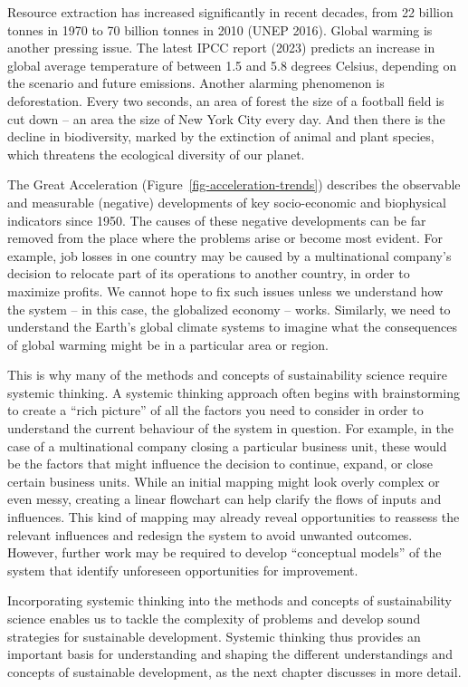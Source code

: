 \documentclass[
  a4paper,
  openany]{book}
\begin{document}
Resource extraction has increased significantly in recent decades, from
22 billion tonnes in 1970 to 70 billion tonnes in 2010 (UNEP 2016).
Global warming is another pressing issue. The latest IPCC report (2023)
predicts an increase in global average temperature of between 1.5 and
5.8 degrees Celsius, depending on the scenario and future emissions.
Another alarming phenomenon is deforestation. Every two seconds, an area
of forest the size of a football field is cut down -- an area the size
of New York City every day. And then there is the decline in
biodiversity, marked by the extinction of animal and plant species,
which threatens the ecological diversity of our planet.

The Great Acceleration (Figure~\ref{fig-acceleration-trends}) describes
the observable and measurable (negative) developments of key
socio-economic and biophysical indicators since 1950. The causes of
these negative developments can be far removed from the place where the
problems arise or become most evident. For example, job losses in one
country may be caused by a multinational company's decision to relocate
part of its operations to another country, in order to maximize profits.
We cannot hope to fix such issues unless we understand how the system --
in this case, the globalized economy -- works. Similarly, we need to
understand the Earth's global climate systems to imagine what the
consequences of global warming might be in a particular area or region.

This is why many of the methods and concepts of sustainability science
require systemic thinking. A systemic thinking approach often begins
with brainstorming to create a ``rich picture'' of all the factors you
need to consider in order to understand the current behaviour of the
system in question. For example, in the case of a multinational company
closing a particular business unit, these would be the factors that
might influence the decision to continue, expand, or close certain
business units. While an initial mapping might look overly complex or
even messy, creating a linear flowchart can help clarify the flows of
inputs and influences. This kind of mapping may already reveal
opportunities to reassess the relevant influences and redesign the
system to avoid unwanted outcomes. However, further work may be required
to develop ``conceptual models'' of the system that identify unforeseen
opportunities for improvement.

Incorporating systemic thinking into the methods and concepts of
sustainability science enables us to tackle the complexity of problems
and develop sound strategies for sustainable development. Systemic
thinking thus provides an important basis for understanding and shaping
the different understandings and concepts of sustainable development, as
the next chapter discusses in more detail.
\end{document}
